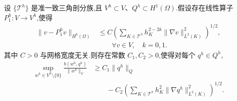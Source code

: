 \begin{lemma}[上确界的下界]\label{lem:continuous-pressure-supremum-lower-bound}
设 $\{\mathcal{T}^h\}$ 是准一致三角剖分族,且 $V^h\subset V$、$Q^h\subset H^1(\Omega)$.假设存在线性算子 $P_1^h:V\to V^h$,使得
\begin{equation}\label{eq:continuous-pressure-interpolant-error}
\begin{aligned}
  \|v-P_1^h v\|_{H^k(\Omega)}
  &\le C\left(
    \sum_{K\in\mathcal{T}^h}
       h_K^{2-2k}\|\nabla v\|_{L^2(K)}^2
       \right)^{1/2},\\
  &\qquad\forall v\in V,\quad k=0,1.
\end{aligned}
\end{equation}
其中 $C>0$ 与网格宽度无关.则存在常数 $C_1,C_2>0$,使得对每个 $q^h\in Q^h$,
\begin{equation}\label{eq:continuous-pressure-discrete-infsup-lower-bound}
\begin{aligned}
  \sup_{w^h\in V^h\setminus\{0\}}
    \frac{b(w^h,q^h)}{\|w^h\|_V}
  &\ge C_1\|q^h\|_Q
      \\
  &\qquad-C_2\left(
       \sum_{K\in\mathcal{T}^h}
           h_K^2\|\nabla q^h\|_{L^2(K)}^2
       \right)^{1/2}.
\end{aligned}
\end{equation}
\end{lemma}

